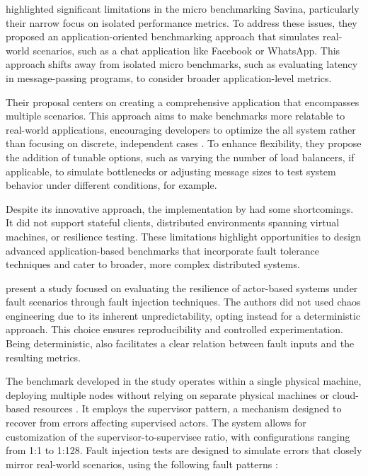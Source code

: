 \textcite{Blessing2019} highlighted significant limitations in the micro benchmarking Savina, particularly their narrow focus on isolated performance metrics. To address these issues, they proposed an application-oriented benchmarking approach that simulates real-world scenarios, such as a chat application like Facebook or WhatsApp. This approach shifts away from isolated micro benchmarks, such as evaluating latency in message-passing programs, to consider broader application-level metrics.

Their proposal centers on creating a comprehensive application that encompasses multiple scenarios. This approach aims to make benchmarks more relatable to real-world applications, encouraging developers to optimize the all system rather than focusing on discrete, independent cases \cite{Blessing2019}. To enhance flexibility, they propose the addition of tunable options, such as varying the number of load balancers, if applicable, to simulate bottlenecks or adjusting message sizes to test system behavior under different conditions, for example.

Despite its innovative approach, the implementation by \textcite{Blessing2019} had some shortcomings. It did not support stateful clients, distributed environments spanning virtual machines, or resilience testing. These limitations highlight opportunities to design advanced application-based benchmarks that incorporate fault tolerance techniques and cater to broader, more complex distributed systems.

\textcite{Randtoul2022} present a study focused on evaluating the resilience of actor-based systems under fault scenarios through fault injection techniques. The authors did not used chaos engineering due to its inherent unpredictability, opting instead for a deterministic approach. This choice ensures reproducibility and controlled experimentation. Being deterministic, also facilitates a clear relation between fault inputs and the resulting metrics.

The benchmark developed in the study operates within a single physical machine, deploying multiple nodes without relying on separate physical machines or cloud-based resources \cite{Randtoul2022}. It employs the supervisor pattern, a mechanism designed to recover from errors affecting supervised actors. The system allows for customization of the supervisor-to-supervisee ratio, with configurations ranging from 1:1 to 1:128. Fault injection tests are designed to simulate errors that closely mirror real-world scenarios, using the following fault patterns \cite{Randtoul2022}:

